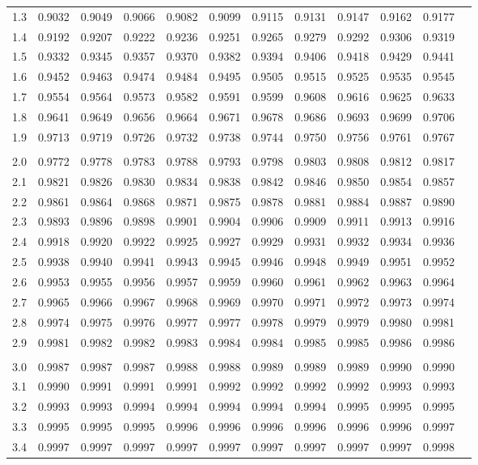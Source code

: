 \documentclass[12pt,twoside,a4paper]{article}
\begin{document}
\begin{center}
\begin{tabular}{rr@{\ }r@{\ }r@{\ }r@{\ }r@{\ }r@{\ }r@{\ }r@{\ }r@{\ }r@{\ }r}
1.3&0.9032&0.9049&0.9066&0.9082&0.9099&0.9115&0.9131&0.9147&0.9162&0.9177\\
1.4&0.9192&0.9207&0.9222&0.9236&0.9251&0.9265&0.9279&0.9292&0.9306&0.9319\\
1.5&0.9332&0.9345&0.9357&0.9370&0.9382&0.9394&0.9406&0.9418&0.9429&0.9441\\
1.6&0.9452&0.9463&0.9474&0.9484&0.9495&0.9505&0.9515&0.9525&0.9535&0.9545\\
1.7&0.9554&0.9564&0.9573&0.9582&0.9591&0.9599&0.9608&0.9616&0.9625&0.9633\\
1.8&0.9641&0.9649&0.9656&0.9664&0.9671&0.9678&0.9686&0.9693&0.9699&0.9706\\
1.9&0.9713&0.9719&0.9726&0.9732&0.9738&0.9744&0.9750&0.9756&0.9761&0.9767\\
\\
2.0&0.9772&0.9778&0.9783&0.9788&0.9793&0.9798&0.9803&0.9808&0.9812&0.9817\\
2.1&0.9821&0.9826&0.9830&0.9834&0.9838&0.9842&0.9846&0.9850&0.9854&0.9857\\
2.2&0.9861&0.9864&0.9868&0.9871&0.9875&0.9878&0.9881&0.9884&0.9887&0.9890\\
2.3&0.9893&0.9896&0.9898&0.9901&0.9904&0.9906&0.9909&0.9911&0.9913&0.9916\\
2.4&0.9918&0.9920&0.9922&0.9925&0.9927&0.9929&0.9931&0.9932&0.9934&0.9936\\
2.5&0.9938&0.9940&0.9941&0.9943&0.9945&0.9946&0.9948&0.9949&0.9951&0.9952\\
2.6&0.9953&0.9955&0.9956&0.9957&0.9959&0.9960&0.9961&0.9962&0.9963&0.9964\\
2.7&0.9965&0.9966&0.9967&0.9968&0.9969&0.9970&0.9971&0.9972&0.9973&0.9974\\
2.8&0.9974&0.9975&0.9976&0.9977&0.9977&0.9978&0.9979&0.9979&0.9980&0.9981\\
2.9&0.9981&0.9982&0.9982&0.9983&0.9984&0.9984&0.9985&0.9985&0.9986&0.9986\\
\\
3.0&0.9987&0.9987&0.9987&0.9988&0.9988&0.9989&0.9989&0.9989&0.9990&0.9990\\
3.1&0.9990&0.9991&0.9991&0.9991&0.9992&0.9992&0.9992&0.9992&0.9993&0.9993\\
3.2&0.9993&0.9993&0.9994&0.9994&0.9994&0.9994&0.9994&0.9995&0.9995&0.9995\\
3.3&0.9995&0.9995&0.9995&0.9996&0.9996&0.9996&0.9996&0.9996&0.9996&0.9997\\
3.4&0.9997&0.9997&0.9997&0.9997&0.9997&0.9997&0.9997&0.9997&0.9997&0.9998\\

\end{tabular}
\end{center}
\end{document}
